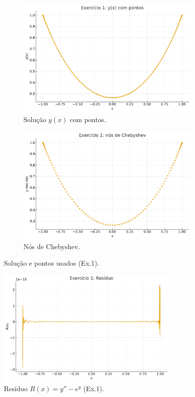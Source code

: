 \documentclass[12pt,a4paper]{article}
\begin{document}
\begin{figure}[H]
  \centering
  \begin{subfigure}[t]{0.48\textwidth}
    \includegraphics[width=\textwidth]{figures/ex1_solution_with_points.pdf}
    \caption{Solução \(y(x)\) com pontos.}
    \label{fig:ex1_y_points}
  \end{subfigure}\hfill
  \begin{subfigure}[t]{0.48\textwidth}
    \includegraphics[width=\textwidth]{figures/ex1_points_only.pdf}
    \caption{Nós de Chebyshev.}
    \label{fig:ex1_points_only}
  \end{subfigure}
  \caption{Solução e pontos usados (Ex.1).}
\end{figure}

\begin{figure}[H]
  \centering
  \includegraphics[width=0.8\textwidth]{figures/ex1_residual.pdf}
  \caption{Resíduo \(R(x)=y''-e^y\) (Ex.1).}
  \label{fig:ex1_R}
\end{figure}
\end{document}

